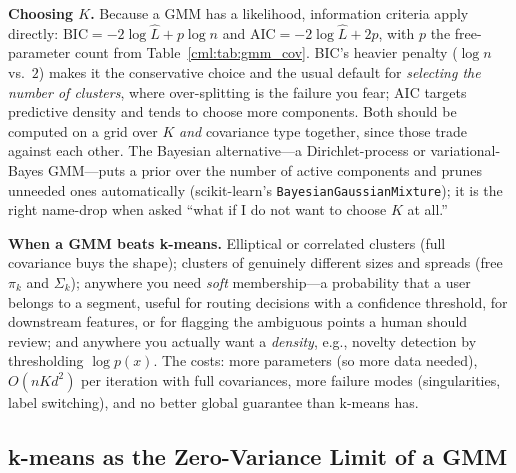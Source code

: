 \textbf{Choosing $K$.} Because a GMM has a likelihood, information criteria apply directly: $\mathrm{BIC} = -2\log\hat{L} + p\log n$ and $\mathrm{AIC} = -2\log\hat{L} + 2p$, with $p$ the free-parameter count from Table~\ref{cml:tab:gmm_cov}. BIC's heavier penalty ($\log n$ vs.\ $2$) makes it the conservative choice and the usual default for \emph{selecting the number of clusters}, where over-splitting is the failure you fear; AIC targets predictive density and tends to choose more components. Both should be computed on a grid over $K$ \emph{and} covariance type together, since those trade against each other. The Bayesian alternative---a Dirichlet-process or variational-Bayes GMM---puts a prior over the number of active components and prunes unneeded ones automatically (scikit-learn's \texttt{BayesianGaussianMixture}); it is the right name-drop when asked ``what if I do not want to choose $K$ at all.''

\textbf{When a GMM beats k-means.} Elliptical or correlated clusters (full covariance buys the shape); clusters of genuinely different sizes and spreads (free $\pi_k$ and $\Sigma_k$); anywhere you need \emph{soft} membership---a probability that a user belongs to a segment, useful for routing decisions with a confidence threshold, for downstream features, or for flagging the ambiguous points a human should review; and anywhere you actually want a \emph{density}, e.g., novelty detection by thresholding $\log p(x)$. The costs: more parameters (so more data needed), $O(nKd^2)$ per iteration with full covariances, more failure modes (singularities, label switching), and no better global guarantee than k-means has.

\subsection{k-means as the Zero-Variance Limit of a GMM}
\label{cml:sec:kmeans_gmm_limit}

